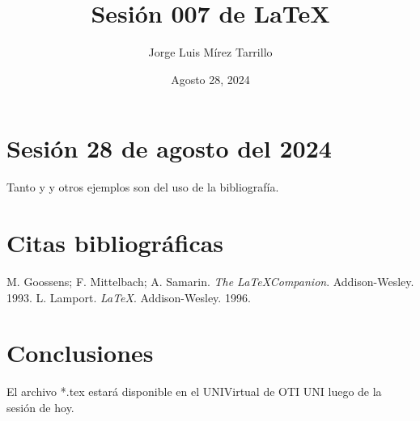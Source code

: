 \documentclass{article}
\title{Sesión 007 de LaTeX}
\author{Jorge Luis Mírez Tarrillo}
\date{Agosto 28, 2024}
\begin{document}
\maketitle

\section*{Sesión 28 de agosto del 2024}

Tanto \cite{Goosens} y \cite{Lamport} y otros ejemplos son del uso de la bibliograf\'ia.

\section{Citas bibliogr\'aficas}

\begin{thebibliography}{99}
 M. Goossens; F. Mittelbach; A. Samarin.
                {\it The \LaTeX Companion}. Addison-Wesley. 1993.
 L. Lamport. {\it \LaTeX}. Addison-Wesley. 1996.
\end{thebibliography}

\section{Conclusiones}
El archivo *.tex estar\'a disponible en el UNIVirtual de OTI UNI luego de la sesión de hoy.
\end{document}
